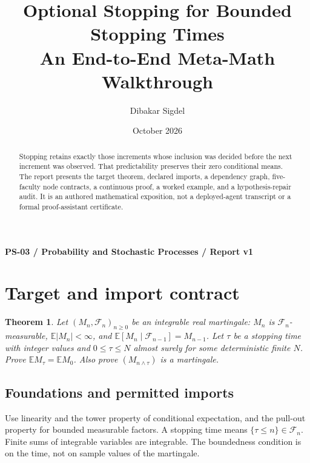 \documentclass[preprint,12pt,aps,pra,showkeys,amsmath,amssymb,superscriptaddress,floatfix]{revtex4-2}
\newtheorem{theorem}{Theorem}[section]
\theoremstyle{definition}
\theoremstyle{remark}
\begin{document}
\title{Optional Stopping for Bounded Stopping Times\\[4pt]\large An End-to-End Meta-Math Walkthrough}

\author{Dibakar Sigdel}


\date{October 2026}

\begin{abstract}

Stopping retains exactly those increments whose inclusion was decided
before the next increment was observed. That predictability preserves
their zero conditional means. The report presents the target theorem,
declared imports, a dependency graph, five-faculty node contracts, a
continuous proof, a worked example, and a hypothesis-repair audit. It is
an authored mathematical exposition, not a deployed-agent transcript or
a formal proof-assistant certificate.

\end{abstract}\maketitle\linespread{1.12}\selectfont

\noindent\textbf{PS-03 / Probability and Stochastic Processes / Report v1}

\section{Target and import contract}

\begin{theorem}

Let \((M_n,\mathcal F_n)_{n\ge0}\) be an integrable real martingale:
\(M_n\) is \(\mathcal F_n\)-measurable, \(\mathbb E|M_n|<\infty\), and
\(\mathbb E[M_n\mid\mathcal F_{n-1}]=M_{n-1}\). Let \(\tau\) be a
stopping time with integer values and \(0\le\tau\le N\) almost surely
for some deterministic finite \(N\). Prove
\(\mathbb EM_\tau=\mathbb EM_0\). Also prove \((M_{n\wedge\tau})\) is a
martingale.

\end{theorem}

\subsection{Foundations and permitted imports}

Use linearity and the tower property of conditional expectation, and the
pull-out property for bounded measurable factors. A stopping time means
\(\{\tau\le n\}\in\mathcal F_n\). Finite sums of integrable variables
are integrable. The boundedness condition is on the time, not on sample
values of the martingale.
\end{document}
